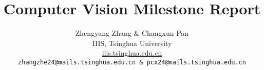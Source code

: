 \documentclass[10pt,twocolumn,letterpaper]{article}
\title{Computer Vision Milestone Report}
\author{Zhengyang Zhang \& Changxun Pan\\
IIIS, Tsinghua University\\
\href{https://iiis.tsinghua.edu.cn}{iiis.tsinghua.edu.cn}\\
{\tt\small zhangzhe24@mails.tsinghua.edu.cn \& pcx24@mails.tsinghua.edu.cn}
}
\begin{document}
\maketitle
%    






{
    \small
    
    
}

% 
\end{document}
